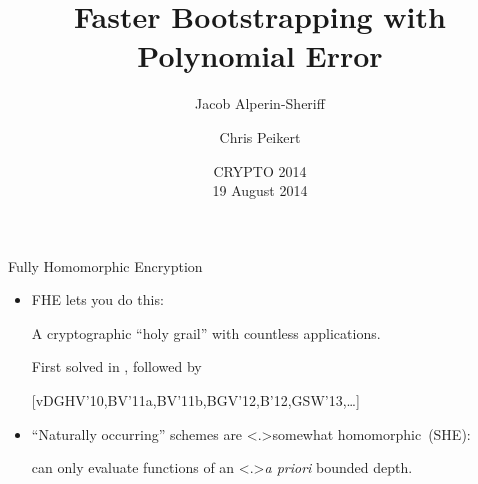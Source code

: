 \documentclass[shadow,xcolor=pdftex,svgnames,table,t]{beamer}
\title
{ Faster Bootstrapping with\\Polynomial Error
}
\author
{ {\Large Jacob Alperin-Sheriff}
  \and
  {\Large Chris Peikert}
}
\institute{School of Computer Science\\Georgia Tech}
\date
{
  CRYPTO 2014\\
  19 August 2014
}
\newcommand{\Green}[1]{{\color{Green}#1}}
\begin{document}
\setlength{\abovedisplayskip}{8pt plus 2pt minus 1pt}
\setlength{\belowdisplayskip}{8pt plus 2pt minus 0pt}
\setlength{\abovedisplayshortskip}{0pt plus 2pt}
\setlength{\belowdisplayshortskip}{8pt plus 2pt minus 1pt}

\begin{frame}[label=title]
  \titlepage
\end{frame}


\begin{frame}[label=fhe]{Fully Homomorphic Encryption {}}
  \begin{itemize}
  \item<+-> FHE lets you do this:
    \begin{center}
    \end{center}

    \medskip
    A cryptographic ``holy grail'' with countless applications.

    \medskip First solved in {\citationsize [Gentry'09]}, followed by

    \hfill
    {\scriptsize [vDGHV'10,BV'11a,BV'11b,BGV'12,B'12,GSW'13,\ldots]}
  \end{itemize}

  \onslide<+->
  \begin{itemize}
  \item ``Naturally occurring'' schemes are \alert<.>{somewhat
      homomorphic}~(SHE):

    can only evaluate functions of an \alert<.>{\textit{a priori}
      bounded} depth.
  \end{itemize}

  \begin{center}
\end{center}
\end{frame}
\end{document}
